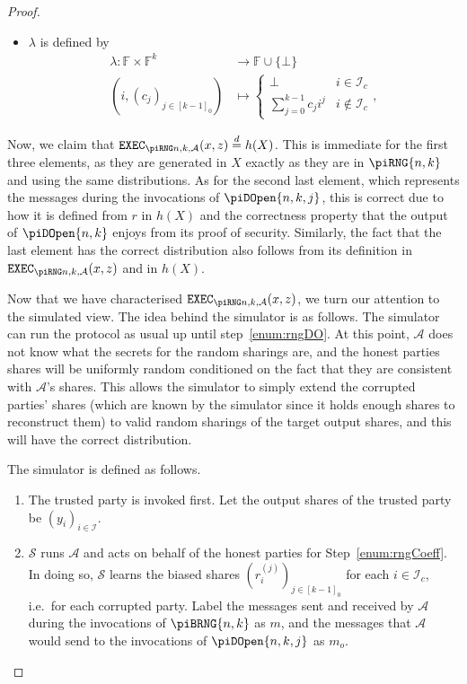 \documentclass{article}
\newcommand{\eqd}[0]{\stackrel{d}{=}}
\newcommand{\seqZ}[1]{\left[#1\right]_0}
\theoremstyle{remark}
\newcommand{\F}{\mathbb{F}}
\begin{document}
\begin{proof}
\begin{itemize}
		\item $\lambda$ is defined by
			\begin{align*}
				\lambda: \F \times \F^k
				&\to
				\F \cup \{\bot\}\\
				\left(
					i,
					{(c_j)}_{j \in \seqZ{k-1}}
				\right)
				&\mapsto
				\begin{cases}
					\bot & i \in \mathcal{I}_c\\
					\sum_{j=0}^{k-1} c_j i^j & i \notin \mathcal{I}_c
				\end{cases},
			\end{align*}
	\end{itemize}

	Now, we claim that $\execD \eqd h(X)$. This is immediate for the first
	three elements, as they are generated in $X$ exactly as they are in
	$\piRNG{n,k}$ and using the same distributions. As for the second last
	element, which represents the messages during the invocations of
	$\piDOpen{n,k,j}$, this is correct due to how it is defined from $r$ in
	$h(X)$ and the correctness property that the output of $\piDOpen{n,k}$
	enjoys from its proof of security. Similarly, the fact that the last
	element has the correct distribution also follows from its definition in
	$\execD$ and in $h(X)$.

	Now that we have characterised $\execD$, we turn our attention to the
	simulated view. The idea behind the simulator is as follows. The simulator
	can run the protocol as usual up until step~\ref{enum:rngDO}. At this
	point, $\mathcal{A}$ does not know what the secrets for the random sharings
	are, and the honest parties shares will be uniformly random conditioned on
	the fact that they are consistent with $\mathcal{A}$'s shares. This allows
	the simulator to simply extend the corrupted parties' shares (which are
	known by the simulator since it holds enough shares to reconstruct them) to
	valid random sharings of the target output shares, and this will have the
	correct distribution.

	The simulator is defined as follows.
	\begin{enumerate}
		\item The trusted party is invoked first. Let the output shares of the
			trusted party be ${(y_i)}_{i \in \mathcal{I}}$.

		\item $\mathcal{S}$ runs $\mathcal{A}$ and acts on behalf of the honest
			parties for Step~\ref{enum:rngCoeff}. In doing so, $\mathcal{S}$
			learns the biased shares ${\left(r_i^{(j)}\right)}_{j \in
			\seqZ{k-1}}$ for each $i \in \mathcal{I}_c$, i.e.\ for each
			corrupted party. Label the messages sent and received by
			$\mathcal{A}$ during the invocations of $\piBRNG{n,k}$ as $m$, and
			the messages that $\mathcal{A}$ would send to the invocations of
			$\piDOpen{n,k,j}$ as $m_o$.


\end{enumerate}
\end{proof}
\end{document}

